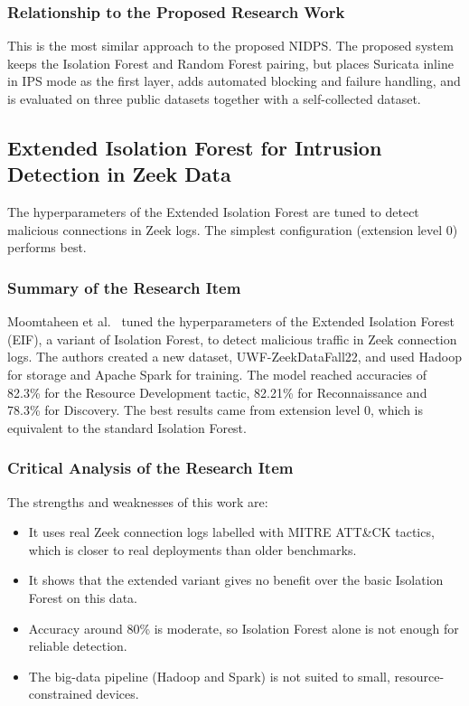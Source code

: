 \subsubsection{Relationship to the Proposed Research Work}\label{sec:3.2.7.3}

\noindent This is the most similar approach to the proposed NIDPS. The proposed system keeps the Isolation Forest and Random Forest pairing, but places Suricata inline in IPS mode as the first layer, adds automated blocking and failure handling, and is evaluated on three public datasets together with a self-collected dataset.

\subsection{Extended Isolation Forest for Intrusion Detection in Zeek Data}\label{sec:3.2.8}

\noindent The hyperparameters of the Extended Isolation Forest are tuned to detect malicious connections in Zeek logs. The simplest configuration (extension level 0) performs best.

\subsubsection{Summary of the Research Item}\label{sec:3.2.8.1}

\noindent Moomtaheen et al.~\cite{lr:moomtaheen2024} tuned the hyperparameters of the Extended Isolation Forest (EIF), a variant of Isolation Forest, to detect malicious traffic in Zeek connection logs. The authors created a new dataset, UWF-Zeek\-DataFall22, and used Hadoop for storage and Apache Spark for training. The model reached accuracies of 82.3\% for the Resource Development tactic, 82.21\% for Reconnaissance and 78.3\% for Discovery. The best results came from extension level 0, which is equivalent to the standard Isolation Forest.

\subsubsection{Critical Analysis of the Research Item}\label{sec:3.2.8.2}

\noindent The strengths and weaknesses of this work are:

\begin{itemize}
\item It uses real Zeek connection logs labelled with MITRE ATT\&CK tactics, which is closer to real deployments than older benchmarks.
\item It shows that the extended variant gives no benefit over the basic Isolation Forest on this data.
\item Accuracy around 80\% is moderate, so Isolation Forest alone is not enough for reliable detection.
\item The big-data pipeline (Hadoop and Spark) is not suited to small, resource-constrained devices.
\end{itemize}

